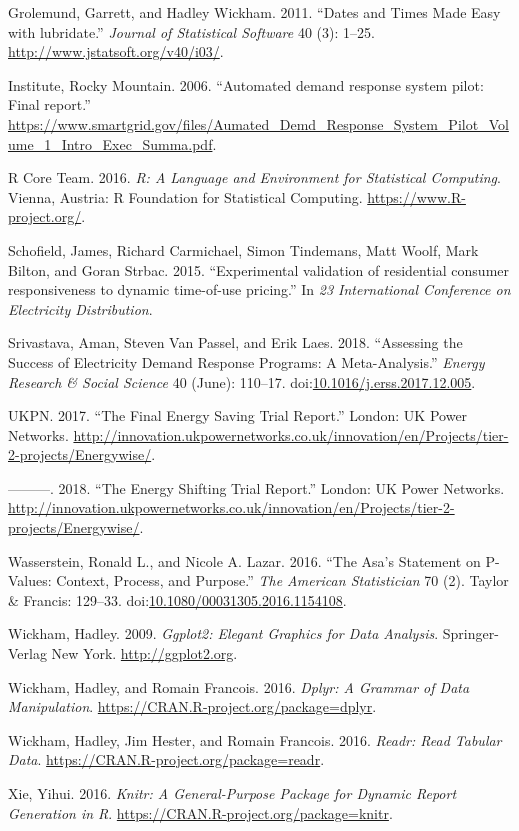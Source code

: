 \documentclass[]{article}
\theoremstyle{definition}
\theoremstyle{definition}
\theoremstyle{definition}
\theoremstyle{remark}
\begin{document}
\hypertarget{ref-lubridate}{}
Grolemund, Garrett, and Hadley Wickham. 2011. ``Dates and Times Made
Easy with lubridate.'' \emph{Journal of Statistical Software} 40 (3):
1--25. \url{http://www.jstatsoft.org/v40/i03/}.

\hypertarget{ref-RockyMountainInstitute2006Automated}{}
Institute, Rocky Mountain. 2006. ``Automated demand response system
pilot: Final report.''
\url{https://www.smartgrid.gov/files/Aumated_Demd_Response_System_Pilot_Volume_1_Intro_Exec_Summa.pdf}.

\hypertarget{ref-baseR}{}
R Core Team. 2016. \emph{R: A Language and Environment for Statistical
Computing}. Vienna, Austria: R Foundation for Statistical Computing.
\url{https://www.R-project.org/}.

\hypertarget{ref-Schofield2015Experimental}{}
Schofield, James, Richard Carmichael, Simon Tindemans, Matt Woolf, Mark
Bilton, and Goran Strbac. 2015. ``Experimental validation of residential
consumer responsiveness to dynamic time-of-use pricing.'' In \emph{23
International Conference on Electricity Distribution}.

\hypertarget{ref-Srivastava2018Assessing}{}
Srivastava, Aman, Steven Van Passel, and Erik Laes. 2018. ``Assessing
the Success of Electricity Demand Response Programs: A Meta-Analysis.''
\emph{Energy Research \& Social Science} 40 (June): 110--17.
doi:\href{https://doi.org/10.1016/j.erss.2017.12.005}{10.1016/j.erss.2017.12.005}.

\hypertarget{ref-energyWiseT1}{}
UKPN. 2017. ``The Final Energy Saving Trial Report.'' London: UK Power
Networks.
\url{http://innovation.ukpowernetworks.co.uk/innovation/en/Projects/tier-2-projects/Energywise/}.

\hypertarget{ref-energyWiseT2}{}
---------. 2018. ``The Energy Shifting Trial Report.'' London: UK Power
Networks.
\url{http://innovation.ukpowernetworks.co.uk/innovation/en/Projects/tier-2-projects/Energywise/}.

\hypertarget{ref-wasserstein2016}{}
Wasserstein, Ronald L., and Nicole A. Lazar. 2016. ``The Asa's Statement
on P-Values: Context, Process, and Purpose.'' \emph{The American
Statistician} 70 (2). Taylor \& Francis: 129--33.
doi:\href{https://doi.org/10.1080/00031305.2016.1154108}{10.1080/00031305.2016.1154108}.

\hypertarget{ref-ggplot2}{}
Wickham, Hadley. 2009. \emph{Ggplot2: Elegant Graphics for Data
Analysis}. Springer-Verlag New York. \url{http://ggplot2.org}.

\hypertarget{ref-dplyr}{}
Wickham, Hadley, and Romain Francois. 2016. \emph{Dplyr: A Grammar of
Data Manipulation}. \url{https://CRAN.R-project.org/package=dplyr}.

\hypertarget{ref-readr}{}
Wickham, Hadley, Jim Hester, and Romain Francois. 2016. \emph{Readr:
Read Tabular Data}. \url{https://CRAN.R-project.org/package=readr}.

\hypertarget{ref-knitr}{}
Xie, Yihui. 2016. \emph{Knitr: A General-Purpose Package for Dynamic
Report Generation in R}. \url{https://CRAN.R-project.org/package=knitr}.
\end{document}
